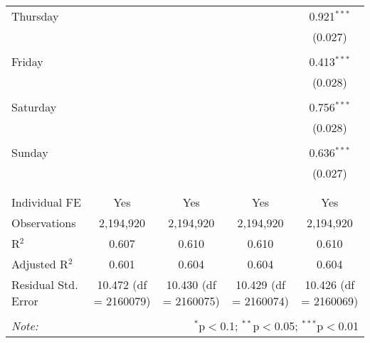 \documentclass[
]{article}
\begin{document}
\begin{table}[!htbp]
{\begin{tabular}{@{\extracolsep{5pt}}lcccc}
 Thursday &  &  &  & 0.921$^{***}$ \\ 
  &  &  &  & (0.027) \\ 
  & & & & \\ 
 Friday &  &  &  & 0.413$^{***}$ \\ 
  &  &  &  & (0.028) \\ 
  & & & & \\ 
 Saturday &  &  &  & 0.756$^{***}$ \\ 
  &  &  &  & (0.028) \\ 
  & & & & \\ 
 Sunday &  &  &  & 0.636$^{***}$ \\ 
  &  &  &  & (0.027) \\ 
  & & & & \\ 
\hline \\[-1.8ex] 
Individual FE & Yes & Yes & Yes & Yes \\ 
Observations & 2,194,920 & 2,194,920 & 2,194,920 & 2,194,920 \\ 
R$^{2}$ & 0.607 & 0.610 & 0.610 & 0.610 \\ 
Adjusted R$^{2}$ & 0.601 & 0.604 & 0.604 & 0.604 \\ 
Residual Std. Error & 10.472 (df = 2160079) & 10.430 (df = 2160075) & 10.429 (df = 2160074) & 10.426 (df = 2160069) \\ 
\hline 
\hline \\[-1.8ex] 
\textit{Note:}  & \multicolumn{4}{r}{$^{*}$p$<$0.1; $^{**}$p$<$0.05; $^{***}$p$<$0.01} \\ 
\end{tabular}
} 
\end{table} 
\newpage
\end{document}
